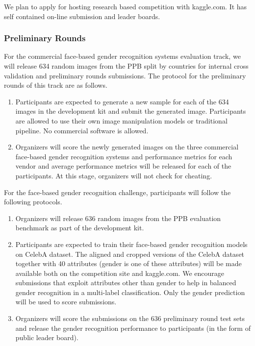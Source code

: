\documentclass[11pt, oneside]{article}
\begin{document}
We plan to apply for hosting research based competition with kaggle.com. It has 
self contained on-line submission and leader boards.

\subsubsection{Preliminary Rounds}

For the commercial face-based gender recognition systems evaluation track, we 
will release 634 random images from the PPB split by countries for internal 
cross validation and preliminary rounds submissions. The protocol for the 
preliminary rounds of this track are as follows.

\begin{enumerate}
    \item Participants are expected to generate a new sample for each of the 
    634 images in the development kit and submit the generated image. 
    Participants are allowed to use their own image manipulation models or 
    traditional pipeline. No commercial software is allowed.
    \item Organizers will score the newly generated images on the three 
    commercial face-based gender recognition systems and performance metrics 
    for each vendor and average performance metrics will be released for each 
    of the participants. At this stage, organizers will not check for cheating.
\end{enumerate}

For the face-based gender recognition challenge, participants will follow the 
following protocols.

\begin{enumerate}
    \item Organizers will release 636 random images from the PPB evaluation 
    benchmark as part of the development kit.
    \item Participants are expected to train their face-based gender 
    recognition models on CelebA dataset. The aligned and cropped versions of 
    the CelebA dataset together with 40 attributes (gender is one of these 
    attributes) will be made available both on the competition site and 
    kaggle.com. We encourage submissions that exploit attributes other than 
    gender to help in balanced gender recognition in a multi-label 
    classification. Only the gender prediction will be used to score 
    submissions.
    \item Organizers will score the submissions on the 636 preliminary round 
    test sets and release the gender recognition performance to participants 
    (in the form of public leader board).
\end{enumerate}
\end{document}
